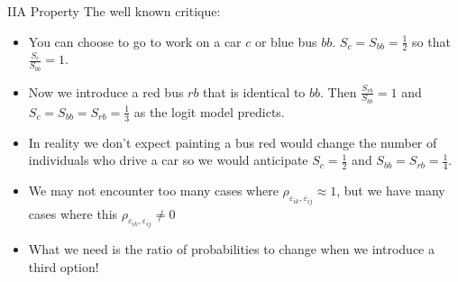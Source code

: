 \documentclass[xcolor=pdftex,dvipsnames,table,mathserif,aspectratio=169]{beamer}
\begin{document}
%

\begin{frame}{IIA Property}
The well known critique:
\begin{itemize}
\item You can choose to go to work on a car $c$ or blue bus $bb$. $S_{c} = S_{bb} = \frac{1}{2}$ so that $\frac{S_c}{S_{bb}} = 1$.
\item Now we introduce a red bus $rb$ that is identical to $bb$. Then $\frac{S_{rb}}{S_{bb}} = 1$ and $S_{c} = S_{bb}= S_{rb} = \frac{1}{3}$ as the logit model predicts.
\item In reality we don't expect painting a bus red would change the number of individuals who drive a car so we would anticipate $S_{c} = \frac{1}{2}$ and $S_{bb} = S_{rb} = \frac{1}{4}$.
\item We may not encounter too many cases where $\rho_{\varepsilon_{ik},\varepsilon_{ij}} \approx 1$, but we have many cases where this $\rho_{\varepsilon_{ik},\varepsilon_{ij}} \neq 0$
\item What we need is the ratio of probabilities to change when we introduce a third option!
\end{itemize}
\end{frame}
\end{document}
